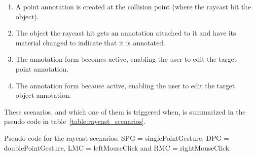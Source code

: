 \begin{enumerate}
    \item A point annotation is created at the collision point (where the raycast hit the object).
    \item The object the raycast hit gets an annotation attached to it and have its material changed to indicate that it is annotated.
    \item The annotation form becomes active, enabling the user to edit the target point annotation.
    \item The annotation form because active, enabling the user to edit the target object annotation.
\end{enumerate}
 
These scenarios, and which one of them is triggered when, is summarized in the pseudo code in table~\vref{table:raycast_scenarios}.

%     
% 
%     
% 
% 

\begin{algorithm}[H]
\label{table:raycast_scenarios}


\caption[Pseudo code for the raycast scenarios]{Pseudo code for the raycast scenarios. 
SPG = singlePointGesture, DPG = doublePointGesture, LMC = leftMouseClick and RMC = rightMouseClick}
\end{algorithm}

